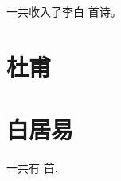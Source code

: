 \documentclass[twocolumn]{ctexart}
\newcommand{\二号}{\fontsize{21pt}{\baselineskip}\selectfont}%
\newcommand{\三号}{\fontsize{15.75pt}{\baselineskip}\selectfont}
\newcommand{\四号}{\fontsize{14pt}{\baselineskip}\selectfont}
\newcounter{poetrycounterall} %
\newcounter{poetrycounter}[section] %
\newcounter{poetrycountersub}[subsection] %
\begin{document}
\setcounter{libaiqijuecot}{\thepoetrycountersub}

一共收入了李白 \thepoetrycounter  首诗。

\clearpage


\section{杜甫}





\clearpage
\section{白居易}





\clearpage

% 
% 
% 

一共有 \thepoetrycounterall 首.
\end{document}

